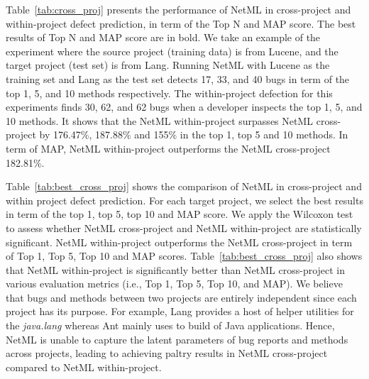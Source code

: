 Table~\ref{tab:cross_proj} presents the performance of NetML in cross-project and within-project defect prediction, in term of the Top N and MAP score. The best results of Top N and MAP score are in bold. We take an example of the experiment where the source project (training data) is from Lucene, and the target project (test set) is from Lang. Running NetML with Lucene as the training set and Lang as the test set detects 17, 33, and 40 bugs in term of the top 1, 5, and 10 methods respectively. The within-project defection for this experiments finds 30, 62, and 62 bugs when a developer inspects the top 1, 5, and 10 methods. It shows that the NetML within-project surpasses NetML cross-project by 176.47\%, 187.88\% and 155\% in the top 1, top 5 and 10 methods. In term of MAP, NetML within-project outperforms the NetML cross-project 182.81\%. 

Table~\ref{tab:best_cross_proj} shows the comparison of NetML in cross-project and within project defect prediction. For each target project, we select the best results in term of the top 1, top 5, top 10 and MAP score. We apply the Wilcoxon test to assess whether NetML cross-project and NetML within-project are statistically significant. NetML within-project outperforms the NetML cross-project in term of Top 1, Top 5, Top 10 and MAP scores. Table~\ref{tab:best_cross_proj} also shows that NetML within-project is significantly better than NetML cross-project in various evaluation metrics (i.e., Top 1, Top 5, Top 10, and MAP). We believe that bugs and methods between two projects are entirely independent since each project has its purpose. For example, Lang provides a host of helper utilities for the \textit{java.lang} whereas Ant mainly uses to build of Java applications. Hence, NetML is unable to capture the latent parameters of bug reports and methods across projects, leading to achieving paltry results in NetML cross-project compared to NetML within-project.

  

